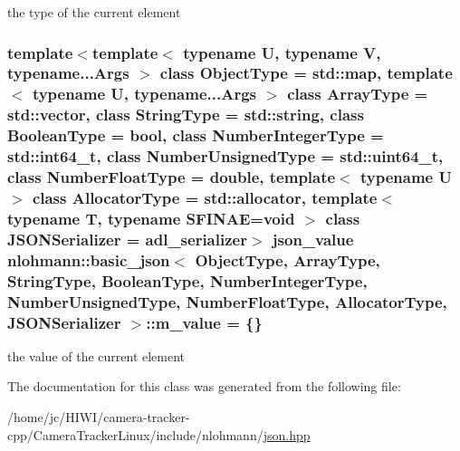 the type of the current element 

\subsubsection[{\texorpdfstring{m\+\_\+value}{m_value}}]{\setlength{\rightskip}{0pt plus 5cm}template$<$template$<$ typename U, typename V, typename...\+Args $>$ class Object\+Type = std\+::map, template$<$ typename U, typename...\+Args $>$ class Array\+Type = std\+::vector, class String\+Type  = std\+::string, class Boolean\+Type  = bool, class Number\+Integer\+Type  = std\+::int64\+\_\+t, class Number\+Unsigned\+Type  = std\+::uint64\+\_\+t, class Number\+Float\+Type  = double, template$<$ typename U $>$ class Allocator\+Type = std\+::allocator, template$<$ typename T, typename S\+F\+I\+N\+A\+E=void $>$ class J\+S\+O\+N\+Serializer = adl\+\_\+serializer$>$ {\bf json\+\_\+value} {\bf nlohmann\+::basic\+\_\+json}$<$ Object\+Type, Array\+Type, String\+Type, Boolean\+Type, Number\+Integer\+Type, Number\+Unsigned\+Type, Number\+Float\+Type, Allocator\+Type, J\+S\+O\+N\+Serializer $>$\+::m\+\_\+value = \{\}\hspace{0.3cm}{\ttfamily [private]}}\hypertarget{classnlohmann_1_1basic__json_aeb0814f76966f99290cb29e127c90a77}{}\label{classnlohmann_1_1basic__json_aeb0814f76966f99290cb29e127c90a77}


the value of the current element 



The documentation for this class was generated from the following file\+:\begin{DoxyCompactItemize}
\item 
/home/jc/\+H\+I\+W\+I/camera-\/tracker-\/cpp/\+Camera\+Tracker\+Linux/include/nlohmann/\hyperlink{json_8hpp}{json.\+hpp}\end{DoxyCompactItemize}
